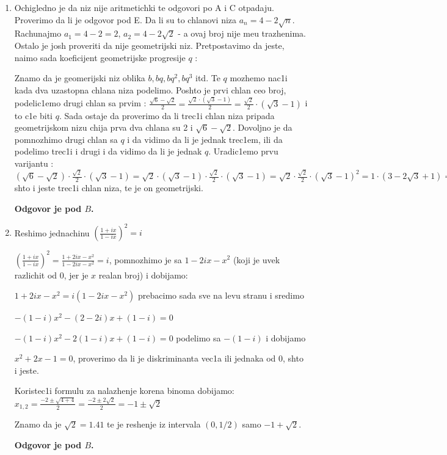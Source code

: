\documentclass[a4paper,12pt]{article}
\begin{document}
\begin{enumerate}[1.]
\item Ochigledno je da niz nije aritmetichki te odgovori po A i C otpadaju. Proverimo da li je odgovor pod E. Da li su to chlanovi niza $a_n = 4 - 2\sqrt{n} $. Rachunajmo $a_1 = 4-2 = 2$, $a_2 = 4 - 2\sqrt{2}$ - a ovaj broj nije me\dj{}u trazhenima. Ostalo je josh proveriti da nije geometrijski niz. Pretpostavimo da jeste, na\dj{}imo sada koeficijent geometrijske progresije $q$ :
\par Znamo da je geomerijski niz oblika $b, bq, bq^2, bq^3$ itd. Te $q$ mozhemo nac1i kada dva uzastopna chlana niza podelimo. Poshto je prvi chlan ceo broj, podelic1emo drugi chlan sa prvim : $ \frac{\sqrt{6} - \sqrt{2}}{2} = \frac{\sqrt{2} \cdot (\sqrt{3} - 1)}{2} =\frac{\sqrt{2}}{2} \cdot (\sqrt{3} - 1) $ i to c1e biti $q$. Sada ostaje da proverimo da li trec1i chlan niza pripada geometrijskom nizu chija prva dva chlana su 2 i $\sqrt{6} - \sqrt{2}$. Dovoljno je da pomnozhimo drugi chlan sa $q$ i da vidimo da li je jednak trec1em, ili da podelimo trec1i i drugi i da vidimo da li je jednak $q$. Uradic1emo prvu varijantu : $(\sqrt{6} - \sqrt{2}) \cdot \frac{\sqrt{2}}{2} \cdot (\sqrt{3} - 1) = \sqrt{2} \cdot (\sqrt{3} - 1) \cdot \frac{\sqrt{2}}{2} \cdot (\sqrt{3} - 1) = \sqrt{2} \cdot \frac{\sqrt{2}}{2} \cdot (\sqrt{3} - 1)^2 = 1 \cdot (3 - 2\sqrt{3} + 1) = 4 - 2\sqrt{2}$ shto i jeste trec1i chlan niza, te je on geometrijski. \par \textbf{Odgovor je pod $B$.}

\item Reshimo jednachinu $\left(\frac{1 + ix}{1 - ix}\right)^2 = i $
\par $\left(\frac{1 + ix}{1 - ix}\right)^2 =\frac{1 +2ix -x^2}{1 -2ix - x^2} = i $, pomnozhimo je sa $1 - 2ix -x^2$ (koji je uvek razlichit od 0, jer je $x$ realan broj) i dobijamo:
\par $1 +2ix -x^2 = i(1 - 2ix -x^2)$ prebacimo sada sve na levu stranu i sredimo
\par $-(1-i)x^2 -(2-2i)x + (1-i) = 0$
\par $-(1-i)x^2 -2(1-i)x + (1-i) = 0$ podelimo sa $-(1-i)$ i dobijamo
\par $x^2 +2x -1 = 0$, proverimo da li je diskriminanta vec1a ili jednaka od 0, shto i jeste.
\par Koristec1i formulu za nalazhenje korena binoma dobijamo: $x_{1,2} = \frac{-2 \pm \sqrt{4 + 4}}{2} = \frac{-2 \pm 2\sqrt{2}}{2} = -1 \pm \sqrt{2}$
\par Znamo da je $\sqrt{2} = 1.41$ te je reshenje iz intervala $(0,1/2)$ samo $-1 + \sqrt{2}$.
\par \textbf{Odgovor je pod $B$.}


\end{enumerate}
\end{document}
